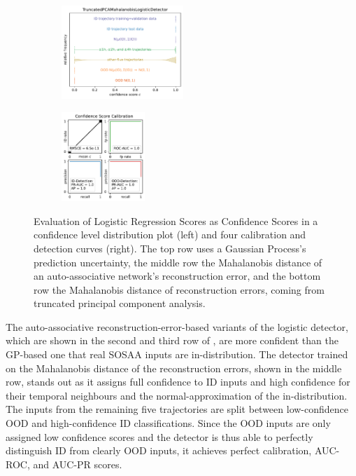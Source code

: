 \begin{figure}[H]
    \begin{subfigure}
        \centering
        \includegraphics[width=0.505\textwidth,valign=t]{ood-detection/figures/confidence-score/ood.truncatedpcamahalanobislogisticdetector-distribution.pdf}
    \end{subfigure}
    \begin{subfigure}
        \centering
        \includegraphics[width=0.345\textwidth,valign=t]{ood-detection/figures/confidence-score/ood.truncatedpcamahalanobislogisticdetector-calibration.pdf}
    \end{subfigure}

    \caption[Evaluation of Logistic Regression Scores as Confidence Scores]{Evaluation of Logistic Regression Scores as Confidence Scores in a confidence level distribution plot (left) and four calibration and detection curves (right). The top row uses a Gaussian Process's prediction uncertainty, the middle row the Mahalanobis distance of an auto-associative network's reconstruction error, and the bottom row the Mahalanobis distance of reconstruction errors, coming from truncated principal component analysis.}
    \label{fig:logistic-ood-scoring}
\end{figure}

\vspace{-1em}
\noindent The auto-associative reconstruction-error-based variants of the logistic detector, which are shown in the second and third row of , are more confident than the GP-based one that real SOSAA inputs are in-distribution. The detector trained on the Mahalanobis distance of the reconstruction errors, shown in the middle row, stands out as it assigns full confidence to ID inputs and high confidence for their temporal neighbours and the normal-approximation of the in-distribution. The inputs from the remaining five trajectories are split between low-confidence OOD and high-confidence ID classifications. Since the OOD inputs are only assigned low confidence scores and the detector is thus able to perfectly distinguish ID from clearly OOD inputs, it achieves perfect calibration, AUC-ROC, and AUC-PR scores.


